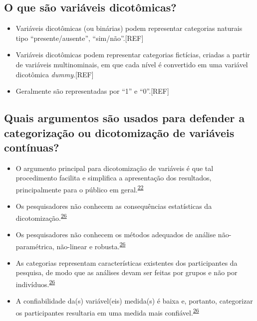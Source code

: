 \documentclass[
]{book}
\begin{document}
\hypertarget{o-que-suxe3o-variuxe1veis-dicotuxf4micas}{%
\subsection{O que são variáveis dicotômicas?}\label{o-que-suxe3o-variuxe1veis-dicotuxf4micas}}

\begin{itemize}
\item
  Variáveis dicotômicas (ou binárias) podem representar categorias naturais tipo ``presente/ausente'', ``sim/não''.{[}REF{]}
\item
  Variáveis dicotômicas podem representar categorias fictícias, criadas a partir de variáveis multinominais, em que cada nível é convertido em uma variável dicotômica \emph{dummy}.{[}REF{]}
\item
  Geralmente são representadas por ``1'' e ``0''.{[}REF{]}
\end{itemize}

\hypertarget{quais-argumentos-suxe3o-usados-para-defender-a-categorizauxe7uxe3o-ou-dicotomizauxe7uxe3o-de-variuxe1veis-contuxednuas}{%
\subsection{Quais argumentos são usados para defender a categorização ou dicotomização de variáveis contínuas?}\label{quais-argumentos-suxe3o-usados-para-defender-a-categorizauxe7uxe3o-ou-dicotomizauxe7uxe3o-de-variuxe1veis-contuxednuas}}

\begin{itemize}
\item
  O argumento principal para dicotomização de variáveis é que tal procedimento facilita e simplifica a apresentação dos resultados, principalmente para o público em geral.\textsuperscript{\protect\hyperlink{ref-Fedorov2009}{22}}
\item
  Os pesquisadores não conhecem as consequências estatísticas da dicotomização.\textsuperscript{\protect\hyperlink{ref-MacCallum2002}{26}}
\item
  Os pesquisadores não conhecem os métodos adequados de análise não-paramétrica, não-linear e robusta.\textsuperscript{\protect\hyperlink{ref-MacCallum2002}{26}}
\item
  As categorias representam características existentes dos participantes da pesquisa, de modo que as análises devam ser feitas por grupos e não por indivíduos.\textsuperscript{\protect\hyperlink{ref-MacCallum2002}{26}}
\item
  A confiabilidade da(s) variável(eis) medida(s) é baixa e, portanto, categorizar os participantes resultaria em uma medida mais confiável.\textsuperscript{\protect\hyperlink{ref-MacCallum2002}{26}}
\end{itemize}
\end{document}
